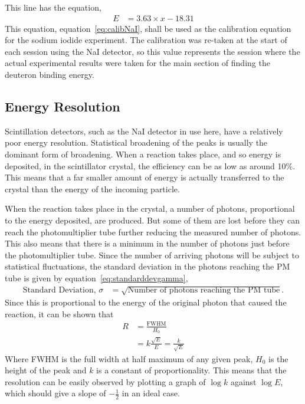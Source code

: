 This line has the equation,
\begin{align}
	E &= 3.63\times x - 18.31 \label{eq:calibNaI}
\end{align}
This equation, equation~\ref{eq:calibNaI}, shall be used as the calibration equation for the sodium iodide experiment. The calibration was re-taken at the start of each session using the NaI detector, so this value represents the session where the actual experimental results were taken for the main section of finding the deuteron binding energy.

\subsection{Energy Resolution} %
\label{sub:energy_resolution}
Scintillation detectors, such as the NaI detector in use here, have a relatively poor energy resolution. Statistical broadening of the peaks is usually the dominant form of broadening. When a reaction takes place, and so energy is deposited, in the scintillator crystal, the efficiency can be as low as around 10\%. This means that a far smaller amount of energy is actually transferred to the crystal than the energy of the incoming particle.

When the reaction takes place in the crystal, a number of photons, proportional to the energy deposited, are produced. But some of them are lost before they can reach the photomultiplier tube further reducing the measured number of photons. This also means that there is a minimum in the number of photons just before the photomultiplier tube. Since the number of arriving photons will be subject to statistical fluctuations, the standard deviation in the photons reaching the PM tube is given by equation~\ref{eq:standarddevgamma}\cite{krane},
\begin{align}
	\text{Standard Deviation, }\sigma &= \sqrt{\text{Number of photons reaching the PM tube}}\label{eq:standarddevgamma}.
\end{align}
Since this is proportional to the energy of the original photon that caused the reaction, it can be shown that
\begin{align}
	R &= \frac{\text{FWHM}}{H_0} \\
	&= k\frac{\sqrt E}{E} = \frac{k}{\sqrt E}
\end{align}
Where FWHM is the full width at half maximum of any given peak, $H_0$ is the height of the peak and $k$ is a constant of proportionality. This means that the resolution can be easily observed by plotting a graph of $\log k$ against $\log E$, which should give a slope of $-\frac{1}{2}$ in an ideal case.

